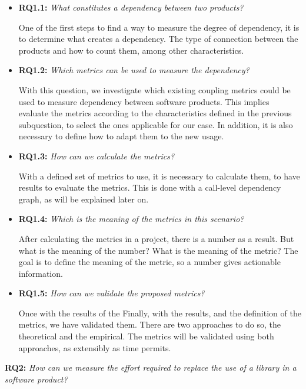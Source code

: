 \begin{itemize}
  \item \textbf{RQ1.1:} \textit{What constitutes a dependency between two products?}

  One of the first steps to find a way to measure the degree of dependency, it is to determine what creates a dependency. The type of connection between the products and how to count them, among other characteristics.
  \blankl

  \item \textbf{RQ1.2:} \textit{Which metrics can be used to measure the dependency?}

  With this question, we investigate which existing coupling metrics could be used to measure dependency between software products. This implies evaluate the metrics according to the characteristics defined in the previous subquestion, to select the ones applicable for our case. In addition, it is also necessary to define how to adapt them to the new usage.
  \blankl

  \item \textbf{RQ1.3:} \textit{How can we calculate the metrics?}

  With a defined set of metrics to use, it is necessary to calculate them, to have results to evaluate the metrics. This is done with a call-level dependency graph, as will be explained later on.
  \blankl

  \item \textbf{RQ1.4:} \textit{Which is the meaning of the metrics in this scenario?}

  After calculating the metrics in a project, there is a number as a result. But what is the meaning of the number? What is the meaning of the metric? The goal is to define the meaning of the metric, so a number gives actionable information.
  \blankl

  \item \textbf{RQ1.5:} \textit{How can we validate the proposed metrics?}

  Once with the results of the Finally, with the results, and the definition of the metrics, we have validated them. There are two approaches to do so, the theoretical and the empirical. The metrics will be validated using both approaches, as extensibly as time permits.
\end{itemize}

\blankl
\textbf{RQ2:} \textit{How can we measure the effort required to replace the use of a library in a software product?}

